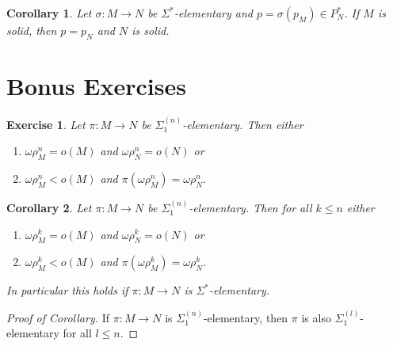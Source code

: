 \documentclass[12pt,a4paper]{article}
\theoremstyle{nicestyle}
\newtheorem{exercise}{Exercise}[subsection]
\newtheorem{corollary}{Corollary}[subsection]
\begin{document}
      \begin{corollary}
        Let $\sigma \colon M \to N$ be $\Sigma^{*}$-elementary and
        $p = \sigma(p_{M}) \in P^{*}_{N}$. If $M$ is solid, then
        $p = p_{N}$ and $N$ is solid.
      \end{corollary}

    \section*{Bonus Exercises}

    \begin{exercise} \label{exercise: projecta are moved correctly}
      Let $\pi \colon M \to N$ be $\Sigma^{(n)}_{1}$-elementary. Then either
      \begin{enumerate}
      \item $\omega\rho^{n}_{M} = o(M)$ and $\omega\rho^{n}_{N} = o(N)$ or
      \item $\omega\rho^{n}_{M} < o(M)$ and
        $\pi(\omega\rho^{n}_{M}) = \omega\rho^{n}_{N}$.
      \end{enumerate}
      
    \end{exercise}

    \begin{corollary}
      Let $\pi \colon M \to N$ be $\Sigma^{(n)}_{1}$-elementary. Then for all $k \le n$ either
      \begin{enumerate}
      \item $\omega\rho^{k}_{M} = o(M)$ and
        $\omega\rho^{k}_{N} = o(N)$ or
      \item $\omega\rho^{k}_{M} < o(M)$ and
        $\pi(\omega\rho^{k}_{M}) = \omega\rho^{k}_{N}$.
      \end{enumerate}
      In particular this holds if $\pi \colon M \to N$ is
      $\Sigma^{*}$-elementary.
      \end{corollary}

      \begin{proof}[Proof of Corollary]
        If $\pi \colon M \to N$ is $\Sigma^{(n)}_{1}$-elementary, then
        $\pi$ is also $\Sigma^{(l)}_{1}$-elementary for all $l \le n$.
      \end{proof}
    
\end{document}
